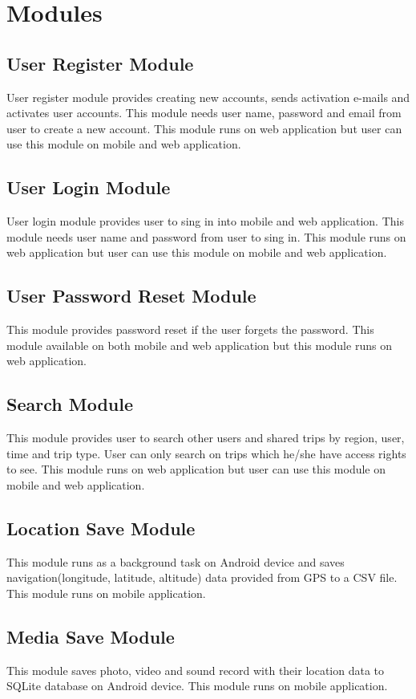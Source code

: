 \newpage
\section{Modules}

\subsection{User Register Module}
User register module provides creating new accounts, sends activation e-mails and activates user accounts. This module needs user name, password and email from user to create a new account. This module runs on web application but user can use this module on mobile and web application.
\subsection{User Login Module}
User login module provides user to sing in into mobile and web application. This module needs user name and password from user to sing in. This module runs on web application but user can use this module on mobile and web application.
\subsection{User Password Reset Module}
This module provides password reset if the user forgets the password. This module available on both mobile and web application but this module runs on web application.
\subsection{Search Module}
This module provides user to search other users and shared trips by region, user, time and trip type. User can only search on trips which he/she have access rights to see. This module runs on web application but user can use this module on mobile and web application. 
\subsection{Location Save Module}
This module runs as a background task on Android device and saves navigation(longitude, latitude, altitude) data provided from GPS to a CSV file. This module runs on mobile application.
\subsection{Media Save Module}
This module saves photo, video and sound record with their location data to SQLite database on Android device. This module runs on mobile application.
